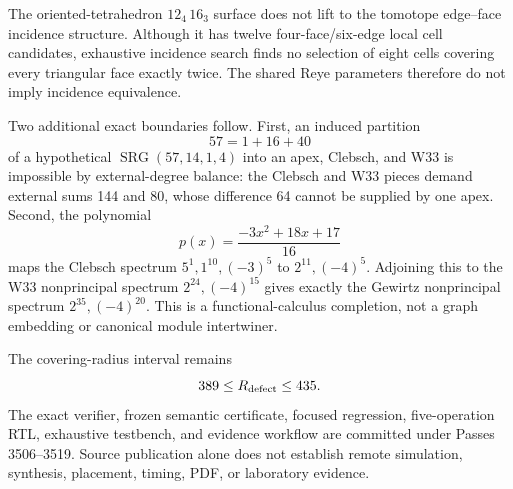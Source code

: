 The oriented-tetrahedron \(12_4\,16_3\) surface does not lift to the tomotope edge--face
incidence structure.  Although it has twelve four-face/six-edge local cell candidates, exhaustive
incidence search finds no selection of eight cells covering every triangular face exactly twice.
The shared Reye parameters therefore do not imply incidence equivalence.

Two additional exact boundaries follow.  First, an induced partition
\[
  57=1+16+40
\]
of a hypothetical \(\operatorname{SRG}(57,14,1,4)\) into an apex, Clebsch, and W33 is
impossible by external-degree balance: the Clebsch and W33 pieces demand external sums 144 and
80, whose difference 64 cannot be supplied by one apex.  Second, the polynomial
\[
  p(x)=\frac{-3x^2+18x+17}{16}
\]
maps the Clebsch spectrum \(5^1,1^{10},(-3)^5\) to \(2^{11},(-4)^5\).  Adjoining this to
the W33 nonprincipal spectrum \(2^{24},(-4)^{15}\) gives exactly the Gewirtz
nonprincipal spectrum \(2^{35},(-4)^{20}\).  This is a functional-calculus completion, not
a graph embedding or canonical module intertwiner.

The covering-radius interval remains
\[
  389\leq R_{\rm defect}\leq435.
\]
The exact verifier, frozen semantic certificate, focused regression, five-operation RTL,
exhaustive testbench, and evidence workflow are committed under Passes 3506--3519.  Source
publication alone does not establish remote simulation, synthesis, placement, timing, PDF, or
laboratory evidence.
